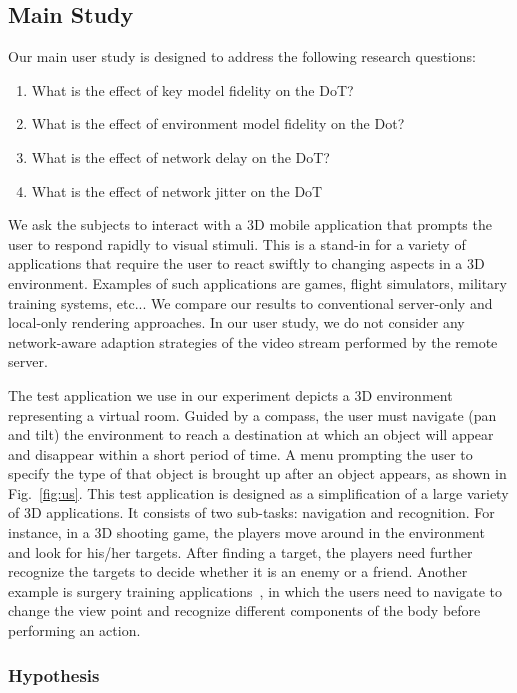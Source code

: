 \subsection{Main Study}
\label{sec:hrr:us:ms}

Our main user study is designed to address the following research questions:
\begin{enumerate}
\item
What is the effect of key model fidelity on the DoT?
\item
What is the effect of environment model fidelity on the Dot?
\item
What is the effect of network delay on the DoT?
\item
What is the effect of network jitter on the DoT
\end{enumerate}

We ask the subjects to interact with a 3D mobile application that prompts the user to respond rapidly to visual stimuli. This is a stand-in for a variety of applications that require the user to react swiftly to changing aspects in a 3D environment. Examples of such applications are games, flight simulators, military training systems, etc... We compare our results to conventional server-only and local-only rendering approaches. In our user study, we do not consider any network-aware adaption strategies of the video stream performed by the remote server.

The test application we use in our experiment depicts a 3D environment representing a virtual room. Guided by a compass, the user must navigate (pan and tilt) the environment to reach a destination at which an object will appear and disappear within a short period of time.
A menu prompting the user to specify the type of that object is brought up after an object appears, as shown in Fig.~\ref{fig:us}.
This test application is designed as a simplification of a large variety of 3D applications. It consists of two sub-tasks: navigation and recognition.
For instance, in a 3D shooting game, the players move around in the environment and look for his/her targets. After finding a target, the players need further recognize the targets to decide whether it is an enemy or a friend.
Another example is surgery training applications~\cite{cecil2013}, in which the users need to navigate to change the view point and recognize different components of the body before performing an action.

\subsubsection{Hypothesis}

